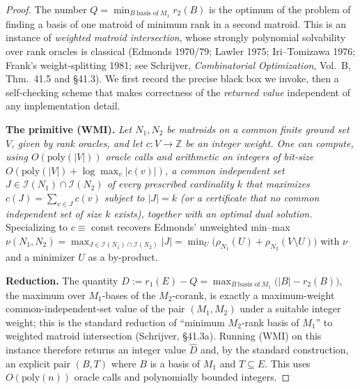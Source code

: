 \documentclass{amsart}
\theoremstyle{plain}
\theoremstyle{definition}
\newcommand{\I}{\mathcal{I}}
\begin{document}
\begin{proof}
The number $Q=\min_{B\ \text{basis of}\ M_1}r_2(B)$ is the optimum of the problem of finding a
basis of one matroid of minimum rank in a second matroid. This is an instance of \emph{weighted
matroid intersection}, whose strongly polynomial solvability over rank oracles is classical
(Edmonds 1970/79; Lawler 1975; Iri--Tomizawa 1976; Frank's weight-splitting 1981; see Schrijver,
\emph{Combinatorial Optimization}, Vol.~B, Thm.~41.5 and \S41.3). We first record the precise
black box we invoke, then a self-checking scheme that makes correctness of the \emph{returned
value} independent of any implementation detail.

\smallskip
\noindent\textbf{The primitive (WMI).}
\emph{Let $N_1,N_2$ be matroids on a common finite ground set $V$, given by rank oracles, and let
$c:V\to\mathbb Z$ be an integer weight. One can compute, using $O(\mathrm{poly}(|V|))$ oracle
calls and arithmetic on integers of bit-size $O(\mathrm{poly}(|V|)+\log\max_v|c(v)|)$, a common
independent set $J\in\I(N_1)\cap\I(N_2)$ of every prescribed cardinality $k$ that maximizes
$c(J)=\sum_{v\in J}c(v)$ subject to $|J|=k$ (or a certificate that no common independent set of
size $k$ exists), together with an optimal dual solution.} Specializing to $c\equiv$ const
recovers Edmonds' unweighted min--max
$\nu(N_1,N_2)=\max_{J\in\I(N_1)\cap\I(N_2)}|J|=\min_{U}\bigl(\rho_{N_1}(U)+\rho_{N_2}(V\setminus
U)\bigr)$ with $\nu$ and a minimizer $U$ as a by-product.

\smallskip
\noindent\textbf{Reduction.}
The quantity $D:=r_1(E)-Q=\max_{B\ \text{basis of}\ M_1}\bigl(|B|-r_2(B)\bigr)$, the maximum over
$M_1$-bases of the $M_2$-corank, is exactly a maximum-weight common-independent-set value of the
pair $(M_1,M_2)$ under a suitable integer weight; this is the standard reduction of ``minimum
$M_2$-rank basis of $M_1$'' to weighted matroid intersection (Schrijver, \S41.3a). Running (WMI)
on this instance therefore returns an integer value $\widehat D$ and, by the standard
construction, an explicit pair $(B,T)$ where $B$ is a basis of $M_1$ and $T\subseteq E$. This uses
$O(\mathrm{poly}(n))$ oracle calls and polynomially bounded integers.


\end{proof}
\end{document}
